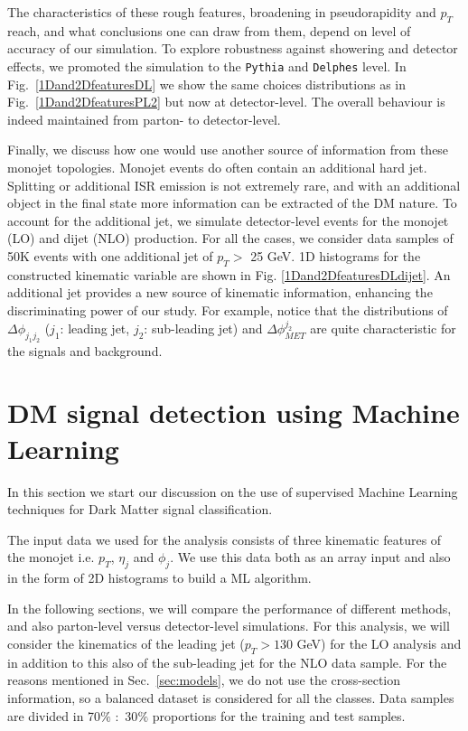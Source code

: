 \documentclass[prd,aps,letterpaper,floatfix,superscriptaddress,preprintnumbers,twocolumn,10pt,nofootinbib]{revtex4-1}
\begin{document}
The characteristics of these rough features, broadening in pseudorapidity and $p_T$ reach, and what conclusions one can draw from them, depend on level of accuracy of our simulation. To explore robustness against showering and detector effects, we promoted the simulation to the {\tt Pythia} and {\tt Delphes} level. In Fig.~\ref{1Dand2DfeaturesDL} we show the same choices distributions as in Fig.~\ref{1Dand2DfeaturesPL2} but now at detector-level. The overall behaviour is indeed maintained from parton- to detector-level. 



Finally, we discuss how one would use another source of information from these monojet topologies. Monojet events do often contain an additional hard jet. Splitting or additional ISR emission is not extremely rare, and  with an additional object in the final state more information can be extracted of the DM nature. To account for the additional jet, we simulate detector-level events for the monojet (LO) and dijet (NLO) production. For all the cases, we consider data samples of 50K events with one additional
jet of $p_T>$ 25 GeV. 1D histograms for the constructed kinematic variable are shown in Fig. \ref{1Dand2DfeaturesDLdijet}. An additional jet provides a new source of kinematic information, enhancing the discriminating power of our study.  For example, notice that the distributions of $\Delta \phi_{j_1j_2}$ ($j_1$: leading jet, $j_2$: sub-leading jet) and 
 $\Delta \phi_{MET}^{j_2}$ are quite characteristic for the signals and background.

\section{DM signal detection using Machine Learning\label{DMvsSM}}

In this section we start our discussion on the  use of supervised Machine Learning techniques for Dark Matter signal classification. 

The input data we used for the analysis consists of three kinematic features of the monojet i.e. $p_T$, $\eta_j$ and $\phi_j$. We use this data both as an array input and also in the form of 2D histograms to build a ML algorithm. 

In the following sections, we will compare the performance of different methods, and also parton-level versus detector-level simulations. For this analysis, we will consider the kinematics of the leading jet ($p_T>130$ GeV) for the LO analysis and in addition to this also of the sub-leading jet for the NLO data sample. For the reasons mentioned in Sec.~\ref{sec:models}, we do not use the cross-section information,   so a balanced dataset is considered for all the classes. Data samples are divided in 70$\%$ $:$ 30$\%$ proportions for the training and test samples. 
\end{document}
